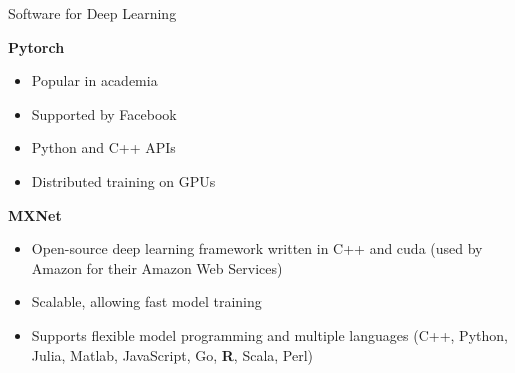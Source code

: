 \begin{frame} {Software for Deep Learning}
  \begin{figure}
    \centering
  \end{figure}

\textbf{Pytorch}
  \begin{itemize}
    \item Popular in academia
    \item Supported by Facebook
    \item Python and C++ APIs
    \item Distributed training on GPUs
  \end{itemize}

  \begin{figure}
    \centering
  \end{figure}
  \vspace{3mm}
  \textbf{MXNet}
    \begin{itemize}
      \item Open-source deep learning framework written in C++ and cuda (used by Amazon for their Amazon Web Services) 
      \item Scalable, allowing fast model training
      \item Supports flexible model programming and multiple languages (C++, Python, Julia, Matlab, JavaScript, Go, \textbf{R}, Scala, Perl)
    \end{itemize}
\end{frame}

